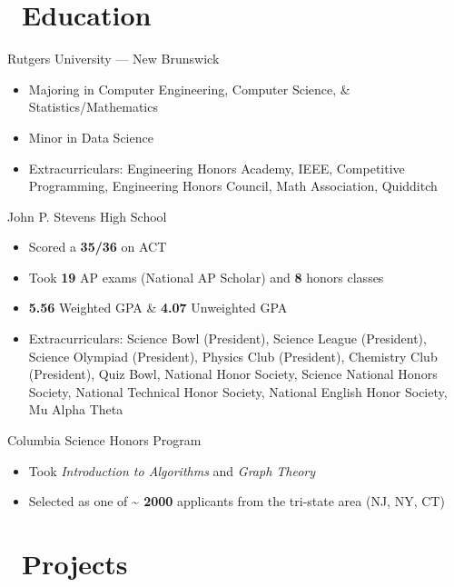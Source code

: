 \documentclass[12]{article}
\begin{document}
\section{\faGraduationCap\ Education}
{Rutgers University --- New Brunswick}
{
  \begin{itemize}
  \item Majoring in Computer Engineering, Computer Science, \& Statistics/Mathematics
  \item Minor in Data Science
  \item Extracurriculars: Engineering Honors Academy, IEEE, Competitive Programming, Engineering Honors Council, Math Association, Quidditch
  \end{itemize}
}
\vspace{-1\baselineskip}
{John P. Stevens High School}
{
  \begin{itemize}
  \item Scored a \textbf{35/36} on ACT
  \item Took \textbf{19} AP exams (National AP Scholar) and \textbf{8} honors classes
  \item \textbf{5.56} Weighted GPA \& \textbf{4.07} Unweighted GPA
  \item Extracurriculars: Science Bowl (President), Science League (President), Science Olympiad (President), Physics Club (President), Chemistry Club (President), Quiz Bowl, National Honor Society, Science National Honors Society, National Technical Honor Society, National English Honor Society, Mu Alpha Theta
  \end{itemize}
}
\vspace{-1\baselineskip}
{Columbia Science Honors Program}
{
  \begin{itemize}
  \item Took \emph{Introduction to Algorithms} and \emph{Graph Theory}
  \item Selected as one of \textbf{\textasciitilde{} 2000} applicants from the tri-state area (NJ, NY, CT)
  \end{itemize}
}
\vspace{-1\baselineskip}


\section{\faSitemap\ Projects}
\end{document}
